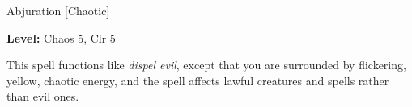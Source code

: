 
Abjuration [Chaotic]

\textbf{Level:} Chaos 5, Clr 5

This spell functions like \textit{dispel evil}, except that you are surrounded 
by flickering, yellow, chaotic energy, and the spell affects lawful creatures and 
spells rather than evil ones.

